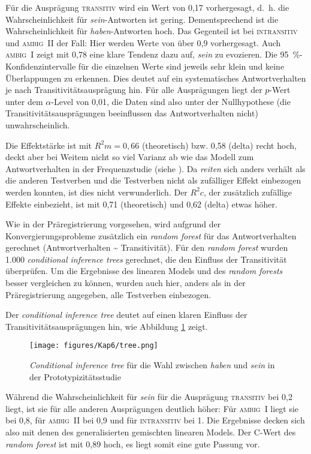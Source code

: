 Für die Ausprägung \textsc{transitiv} wird ein Wert von 0,17 vorhergesagt, d.~h. die Wahrscheinlichkeit für \textit{sein}-Antworten ist gering. Dementsprechend ist die Wahrscheinlichkeit für \textit{haben}-Antworten hoch. Das Gegenteil ist bei \textsc{intransitiv} und \textsc{ambig~II} der Fall: Hier werden Werte von über 0,9 vorhergesagt. Auch \textsc{ambig~I} zeigt mit 0,78 eine klare Tendenz dazu auf, \textit{sein} zu evozieren. Die 95~\%-Kon\-fi\-denz\-in\-ter\-val\-le für die einzelnen Werte sind jeweils sehr klein und keine Überlappungen zu erkennen. Dies deutet auf ein systematisches Antwortverhalten je nach Transitivitätsausprägung hin. Für alle Ausprägungen liegt der $p$-Wert unter dem $\alpha$-Level von 0,01, die Daten sind also unter der Nullhypothese (die Transitivitätsausprägungen beeinflussen das Antwortverhalten nicht) unwahrscheinlich.

Die Effektstärke ist mit $R^2m = 0{,}66$ (theoretisch) bzw. 0,58 (delta) recht hoch, deckt aber bei Weitem nicht so viel Varianz ab wie das Modell zum Antwortverhalten in der Frequenzstudie (siehe ). Da \textit{reiten} sich anders verhält als die anderen Testverben und die Testverben nicht als zufälliger Effekt einbezogen werden konnten, ist dies nicht verwunderlich. Der $R^2c$, der zusätzlich zufällige Effekte einbezieht, ist mit 0,71 (theoretisch) und 0,62 (delta) etwas höher. 

Wie in der Präregistrierung vorgesehen, wird aufgrund der Konvergierungsprobleme zusätzlich ein \textit{random forest} für das Antwortverhalten gerechnet (Antwortverhalten \~{} Transitivität). Für den \textit{random forest} wurden 1.000 \textit{conditional inference trees} gerechnet, die den Einfluss der Transitivität überprüfen. Um die Ergebnisse des linearen Models und des \textit{random forests} besser vergleichen zu können, wurden auch hier, anders als in der Präregistrierung angegeben, alle Testverben einbezogen. 

Der \textit{conditional inference tree}  deutet auf einen klaren Einfluss der Transitivitätsausprägungen hin, wie Abbildung \ref{treetrans} zeigt.

\begin{figure}
\texttt{[image: figures/Kap6/tree.png]} 
\caption{\textit{Conditional inference tree} für die Wahl zwischen \textit{haben} und \textit{sein} in der Prototypizitätsstudie}
\label{treetrans}
\end{figure}

Während die Wahrscheinlichkeit für \textit{sein} für die Ausprägung \textsc{transitiv} bei 0,2 liegt, ist sie für alle anderen Ausprägungen deutlich höher: Für \textsc{ambig~I} liegt sie bei 0,8, für \textsc{ambig~II} bei 0,9 und für \textsc{intransitiv} bei 1. Die Ergebnisse decken sich also mit denen des generalisierten gemischten linearen Models. Der C-Wert des \textit{random forest} ist mit 0,89 hoch, es liegt somit eine gute Passung vor. 

